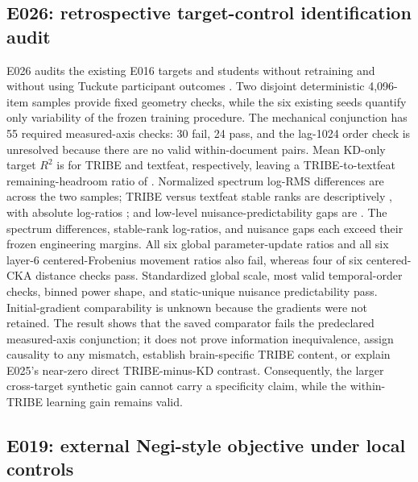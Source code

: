 \subsection{E026: retrospective target-control identification audit}
\label{sec:e026}

E026 audits the existing E016 targets and students without retraining and without using Tuckute participant outcomes .
Two disjoint deterministic 4,096-item samples provide fixed geometry checks, while the six existing seeds quantify only variability of the frozen training procedure.
The mechanical conjunction has 55 required measured-axis checks: 30 fail, 24 pass, and the lag-1024 order check is unresolved because there are no valid within-document pairs.
Mean KD-only target $R^2$ is  for TRIBE and textfeat, respectively, leaving a TRIBE-to-textfeat remaining-headroom ratio of .
Normalized spectrum log-RMS differences are  across the two samples; TRIBE versus textfeat stable ranks are descriptively , with absolute log-ratios ; and low-level nuisance-predictability gaps are . The spectrum differences, stable-rank log-ratios, and nuisance gaps each exceed their frozen engineering margins.
All six global parameter-update ratios and all six layer-6 centered-Frobenius movement ratios also fail, whereas four of six centered-CKA distance checks pass.
Standardized global scale, most valid temporal-order checks, binned power shape, and static-unique nuisance predictability pass.
Initial-gradient comparability is unknown because the gradients were not retained.
The result shows that the saved comparator fails the predeclared measured-axis conjunction; it does not prove information inequivalence, assign causality to any mismatch, establish brain-specific TRIBE content, or explain E025's near-zero direct TRIBE-minus-KD contrast.
Consequently, the larger cross-target synthetic gain cannot carry a specificity claim, while the within-TRIBE learning gain remains valid.

\subsection{E019: external Negi-style objective under local controls}
\label{sec:e019}

